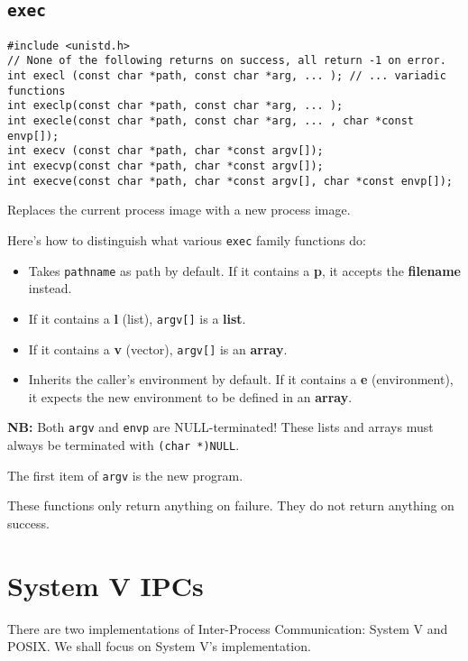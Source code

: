 \documentclass{article}
\begin{document}
\subsection{\texttt{exec}}

\begin{verbatim}
#include <unistd.h>
// None of the following returns on success, all return -1 on error.
int execl (const char *path, const char *arg, ... ); // ... variadic functions
int execlp(const char *path, const char *arg, ... );
int execle(const char *path, const char *arg, ... , char *const envp[]);
int execv (const char *path, char *const argv[]);
int execvp(const char *path, char *const argv[]);
int execve(const char *path, char *const argv[], char *const envp[]);
\end{verbatim}

Replaces the current process image with a new process image.

Here's how to distinguish what various \texttt{exec} family functions do:

\begin{itemize}
    \item Takes \texttt{pathname} as path by default. If it contains a \textbf{p}, it accepts the \textbf{filename} instead.
    \item If it contains a \textbf{l} (list), \texttt{argv[]} is a \textbf{list}.
    \item If it contains a \textbf{v} (vector), \texttt{argv[]} is an \textbf{array}. 
    \item Inherits the caller's environment by default. If it contains a \textbf{e} (environment), it expects the new environment to be defined in an \textbf{array}.
\end{itemize}

\textbf{NB:} Both \texttt{argv} and \texttt{envp} are NULL-terminated! These lists and arrays must always be terminated with \texttt{(char *)NULL}.

The first item of \texttt{argv} is the new program.

These functions only return anything on failure. They do not return anything on success.


\section{System V IPCs}

There are two implementations of Inter-Process Communication: System V and POSIX. We shall focus on System V's implementation.
\end{document}
